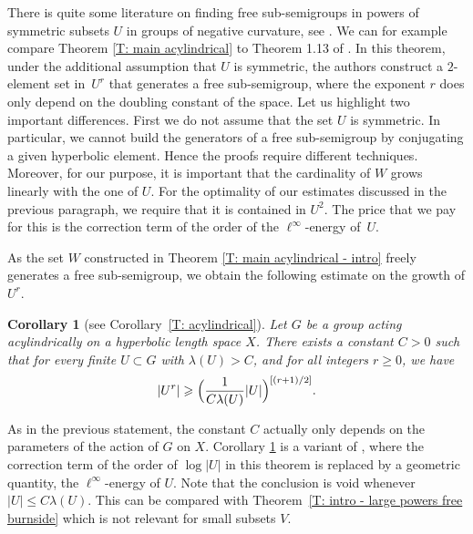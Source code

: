\documentclass[JEP,XML,SOM,Unicode, NoEqCountersInSection,published]{cedram}
\theoremstyle{plain}
\newtheorem{cor}[thm]{Corollary}
\theoremstyle{definition}
\begin{document}
There is quite some literature on finding free sub-semigroups in powers of symmetric subsets $U$ in groups of negative curvature, see \cite{koubi_croissance_1998,arzhantseva_lower_2006,breuillard_joint_2018}.
We can for example compare Theorem \ref{T: main acylindrical} to Theorem 1.13 of \cite{breuillard_joint_2018}. In this theorem, under the additional assumption that $U$ is symmetric, the authors construct a $2$-element set in~$U^r$ that generates a free sub-semigroup, where the exponent $r$ does only depend on the doubling constant of the space.
Let us highlight two important differences.
First we do not assume that the set $U$ is symmetric.
In particular, we cannot build the generators of a free sub-semigroup by conjugating a given hyperbolic element.
Hence the proofs require different techniques.
Moreover, for our purpose, it is important that the cardinality of $W$ grows linearly with the one of $U$. For the optimality of our estimates discussed in the previous paragraph, we require that it is contained in $U^2$.
The price that we pay for this is the correction term of the order of the $\ell^{\infty}$-energy of~$U$.

As the set $W$ constructed in Theorem \ref{T: main acylindrical - intro} freely generates a free sub-semigroup, we obtain the following estimate on the growth of $U^r$.

\begin{cor}[see Corollary~\ref{T: acylindrical}]
\label{T: acylindrical - intro}
Let $G$ be a group acting acylindrically on a hyperbolic length space $X$.
There exists a constant $C > 0$ such that for every finite $U\subset G$ with $\lambda(U)> C$, and for all integers $r\geqslant 0$, we have
\[
|U^r|\geqslant \Bigl(\frac 1{C\lambda(U)} |U| \Bigr)^{[(r+1)/2]} .
\]
\end{cor}

As in the previous statement, the constant $C$ actually only depends on the parameters of the action of $G$ on $X$.
Corollary \ref{T: acylindrical - intro} is a variant of \cite[Th.\,1.14]{delzant_product_2020}, where the correction term of the order of $\log|U|$ in this theorem is replaced by a geometric quantity, the $\ell^{\infty}$-energy of $U$.
Note that the conclusion is void whenever $|U| \leq C \lambda(U)$.
This can be compared with Theorem~\ref{T: intro - large powers free burnside} which is not relevant for small subsets $V$.
\end{document}
